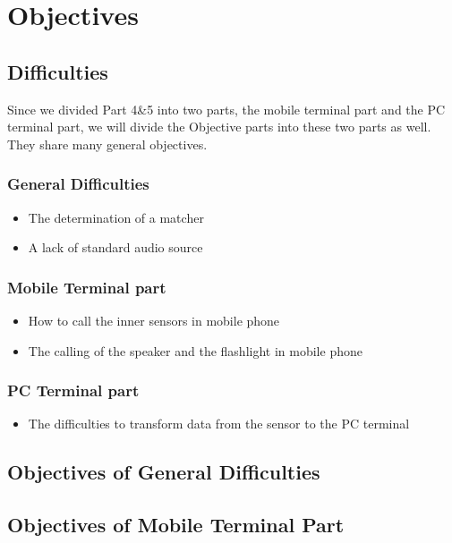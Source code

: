 \documentclass{article}
\begin{document}

\section{Objectives}
\subsection{Difficulties}
\hspace*{2em}Since we divided Part 4\&5 into two parts, the mobile terminal part and the PC terminal part, we will divide the Objective parts into these two parts as well. They share many general objectives. 

\subsubsection{General Difficulties }
\begin{itemize}
\item The determination of a matcher
\item A lack of standard audio source
\end{itemize}

\subsubsection{Mobile Terminal part}
\begin{itemize}
\item How to call the inner sensors in mobile phone
\item The calling of the speaker and the flashlight in mobile phone
\end{itemize}

\subsubsection{PC Terminal part}
\begin{itemize}
\item The difficulties to transform data from the sensor to the PC terminal
\end{itemize}



\subsection{Objectives of General Difficulties}
\subsection{Objectives of Mobile Terminal Part}
\end{document}
